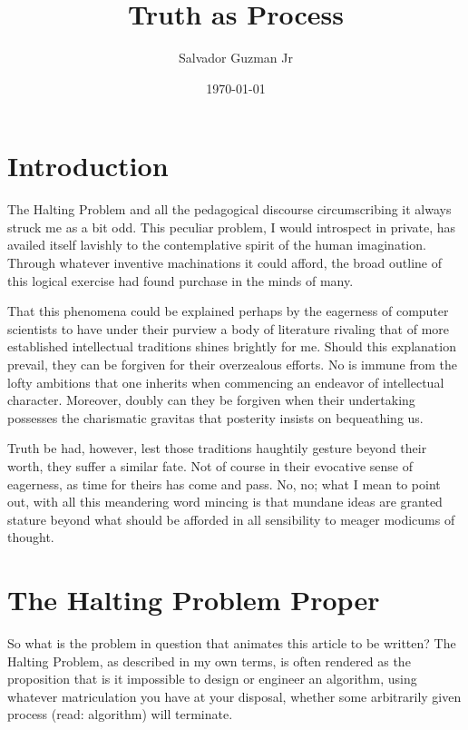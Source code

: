 \documentclass{article}
\begin{document}
	
	\title{Truth as Process}   %
	\author{Salvador Guzman Jr}
	\date{\today}
	\maketitle
	\tableofcontents
	
	\section{Introduction}
	
	The Halting Problem and all the pedagogical discourse circumscribing it always struck me as a bit odd. This peculiar problem, I would introspect in private, has availed itself lavishly to the contemplative spirit of the human imagination. Through whatever inventive machinations it could afford, the broad outline of this logical exercise had found purchase in the minds of many.
	
	That this phenomena could be explained perhaps by the eagerness of computer scientists to have under their purview a body of literature rivaling that of more established intellectual traditions shines brightly for me. Should this explanation prevail, they can be forgiven for their overzealous efforts. No is immune from the lofty ambitions that one inherits when commencing an endeavor of intellectual character. Moreover, doubly can they be forgiven when their undertaking possesses the charismatic gravitas that posterity insists on bequeathing us.
	
	Truth be had, however, lest those traditions haughtily gesture beyond their worth, they suffer a similar fate. Not of course in their evocative sense of eagerness, as time for theirs has come and pass. No, no; what I mean to point out, with all this meandering word mincing is that mundane ideas are granted stature beyond what should be afforded in all sensibility to meager modicums of thought.
	
	\section{The Halting Problem Proper}
	
	So what is the problem in question that animates this article to be written? The Halting Problem, as described in my own terms, is often rendered as the proposition that is it impossible to design or engineer an algorithm, using whatever matriculation you have at your disposal, whether some arbitrarily given process (read: algorithm) will terminate.
	
\end{document}
